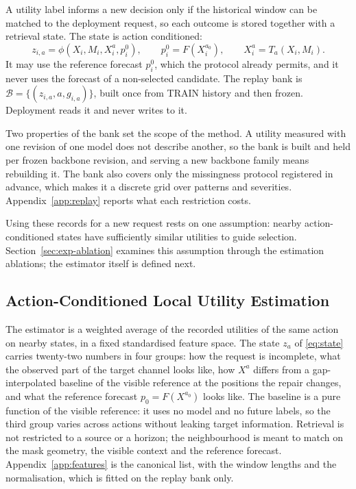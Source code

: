 \documentclass{article}
\newcommand{\calB}{\mathcal{B}}
\begin{document}
A utility label informs a new decision only if the historical window can be matched to the
deployment request, so each outcome is stored together with a retrieval state. The state is
action conditioned:
\begin{equation}
  z_{i,a} = \phi(X_i, M_i, X_i^{a}, p_i^{0}),
  \qquad p_i^{0} = F(X_i^{a_0}),
  \qquad X_i^{a} = T_a(X_i, M_i).
  \label{eq:state}
\end{equation}
It may use the reference forecast $p_i^0$, which the
protocol already permits, and it never uses the forecast of a non-selected candidate. The
replay bank is $\calB = \{(z_{i,a}, a, g_{i,a})\}$, built once from TRAIN history and then
frozen. Deployment reads it and never writes to it.

Two properties of the bank set the scope of the method. A utility measured with one revision
of one model does not describe another, so the bank is built and held per frozen backbone
revision, and serving a new backbone family means rebuilding it. The bank also covers only the
missingness protocol registered in advance, which makes it a discrete grid over patterns and
severities.
Appendix~\ref{app:replay} reports what each restriction costs.

Using these records for a new request rests on one assumption: nearby action-conditioned
states have sufficiently similar utilities to guide selection. Section~\ref{sec:exp-ablation}
examines this assumption through the estimation ablations; the estimator itself is defined next.

\subsection{Action-Conditioned Local Utility Estimation}
\label{sec:method-scoring}
The estimator is a weighted average of the recorded utilities of the same action on nearby
states, in a fixed standardised feature space. The state $z_a$ of \eqref{eq:state} carries
twenty-two numbers in four groups: how the request is incomplete, what the observed part of the
target channel looks like, how $X^{a}$ differs from a gap-interpolated baseline of the visible
reference at the positions the repair changes, and what the reference forecast
$p_0 = F(X^{a_0})$ looks like. The baseline is a pure function of the visible reference: it
uses no model and no future labels, so the third group varies across actions without leaking
target information. Retrieval is not
restricted to a source or a horizon; the neighbourhood is meant to match on the mask geometry,
the visible context and the reference forecast. Appendix~\ref{app:features} is the canonical
list, with the window lengths and the normalisation, which is fitted on the replay bank only.
\end{document}
